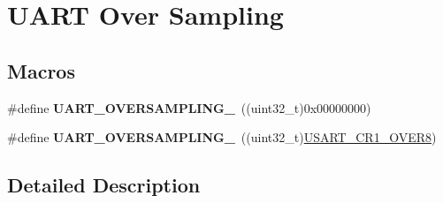 \hypertarget{group___u_a_r_t___over___sampling}{\section{U\-A\-R\-T Over Sampling}
\label{group___u_a_r_t___over___sampling}
}
\subsection*{Macros}
\begin{DoxyCompactItemize}
\item 
\hypertarget{group___u_a_r_t___over___sampling_gaa6a320ec65d248d76f21de818db1a2f0}{\#define {\bfseries U\-A\-R\-T\-\_\-\-O\-V\-E\-R\-S\-A\-M\-P\-L\-I\-N\-G\-\_}~((uint32\-\_\-t)0x00000000)}\label{group___u_a_r_t___over___sampling_gaa6a320ec65d248d76f21de818db1a2f0}

\item 
\hypertarget{group___u_a_r_t___over___sampling_gaeb13896e8bdc1bb041e01a86a868ee0b}{\#define {\bfseries U\-A\-R\-T\-\_\-\-O\-V\-E\-R\-S\-A\-M\-P\-L\-I\-N\-G\-\_}~((uint32\-\_\-t)\hyperlink{group___peripheral___registers___bits___definition_gaed6caeb0cb48f1a7b34090f31a92a8e2}{U\-S\-A\-R\-T\-\_\-\-C\-R1\-\_\-\-O\-V\-E\-R8})}\label{group___u_a_r_t___over___sampling_gaeb13896e8bdc1bb041e01a86a868ee0b}

\end{DoxyCompactItemize}


\subsection{Detailed Description}
